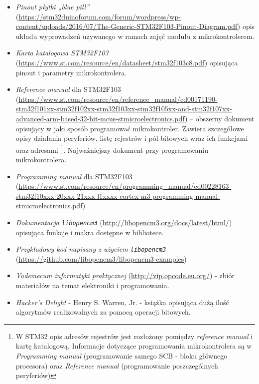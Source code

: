\begin{itemize}
\item \emph{Pinout płytki „blue pill”} (\url{https://stm32duinoforum.com/forum/wordpress/wp-content/uploads/2016/07/The-Generic-STM32F103-Pinout-Diagram.pdf}) opis układu wyprowadzeń używanego w ramach zajęć modułu z mikrokontrolerem.

\item \emph{Karta katalogowa STM32F103} (\url{https://www.st.com/resource/en/datasheet/stm32f103c8.pdf}) opisująca pinout i parametry mikrokontrolera.
\item \emph{Reference manual} dla STM32F103 \label{refman}
	(\url{https://www.st.com/resource/en/reference_manual/cd00171190-stm32f101xx-stm32f102xx-stm32f103xx-stm32f105xx-and-stm32f107xx-advanced-arm-based-32-bit-mcus-stmicroelectronics.pdf})
	– obszerny dokument opisujący w jaki sposób programować  mikrokontroler.
	Zawiera szczegółowe opisy działania peryferiów, listę rejestrów i pól bitowych wraz ich funkcjami oraz  adresami
	\footnote{%
		W STM32 opis adresów rejestrów jest rozłożony pomiędzy \textit{reference manual} i kartę katalogową. Informacje dotyczące
		programowania mikrokontrolera są w \textit{Programming manual} (programowanie samego SCB - bloku głównego procesora) oraz
		\textit{Reference manual} (programowanie poszczególnych peryferiów)
	}.
	Najważniejszy dokument przy programowaniu mikrokontrolera.
\item \emph{Programming manual} dla STM32F103
	(\url{https://www.st.com/resource/en/programming_manual/cd00228163-stm32f10xxx-20xxx-21xxx-l1xxxx-cortex-m3-programming-manual-stmicroelectronics.pdf})

\item \emph{Dokumentacja \Verb$libopencm3$} (\url{http://libopencm3.org/docs/latest/html/}) opisująca funkcje i makra dostępne w bibliotece.
\item \emph{Przykładowy kod napisany z użyciem \Verb$libopencm3$}\\ (\url{https://github.com/libopencm3/libopencm3-examples}) 

\item \emph{Vademecum informatyki praktycznej} (\url{http://vip.opcode.eu.org/}) - zbiór materiałów na temat elektroniki i programowania.
\item \emph{Hacker's Delight} - Henry S. Warren, Jr. - książka opisująca dużą ilość algorytmów realizowalnych za pomocą operacji bitowych.
\end{itemize}
